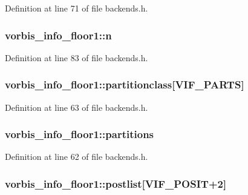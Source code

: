 Definition at line 71 of file backends.\+h.

\subsubsection[{\texorpdfstring{n}{n}}]{ vorbis\+\_\+info\+\_\+floor1\+::n}\hypertarget{structvorbis__info__floor1_a8609b5acccc766282024548fd194e3f6}{}\label{structvorbis__info__floor1_a8609b5acccc766282024548fd194e3f6}


Definition at line 83 of file backends.\+h.

\subsubsection[{\texorpdfstring{partitionclass}{partitionclass}}]{ vorbis\+\_\+info\+\_\+floor1\+::partitionclass\mbox{[}{\bf V\+I\+F\+\_\+\+P\+A\+R\+TS}\mbox{]}}\hypertarget{structvorbis__info__floor1_a2e4121f3de34efb3d3092cfacd9e1913}{}\label{structvorbis__info__floor1_a2e4121f3de34efb3d3092cfacd9e1913}


Definition at line 63 of file backends.\+h.

\subsubsection[{\texorpdfstring{partitions}{partitions}}]{ vorbis\+\_\+info\+\_\+floor1\+::partitions}\hypertarget{structvorbis__info__floor1_a0888c238296237fca49e63f4c684b4b1}{}\label{structvorbis__info__floor1_a0888c238296237fca49e63f4c684b4b1}


Definition at line 62 of file backends.\+h.

\subsubsection[{\texorpdfstring{postlist}{postlist}}]{ vorbis\+\_\+info\+\_\+floor1\+::postlist\mbox{[}{\bf V\+I\+F\+\_\+\+P\+O\+S\+IT}+2\mbox{]}}\hypertarget{structvorbis__info__floor1_a153960a53326cafa537506cb9086156e}{}\label{structvorbis__info__floor1_a153960a53326cafa537506cb9086156e}


